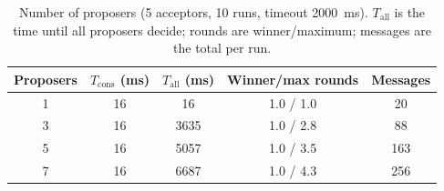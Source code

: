 \begin{table}[htbp]
\centering
\small
\begin{tabular}{c|c|c|c|c}
\hline
Proposers & $T_{\mathrm{cons}}$ (ms) & $T_{\mathrm{all}}$ (ms) & Winner/max rounds & Messages \\
\hline
1 & 16 & 16 & 1.0 / 1.0 & 20 \\
3 & 16 & 3635 & 1.0 / 2.8 & 88 \\
5 & 16 & 5057 & 1.0 / 3.5 & 163 \\
7 & 16 & 6687 & 1.0 / 4.3 & 256 \\
\hline
\end{tabular}
\caption{Number of proposers (5 acceptors, 10 runs, timeout 2000~ms). $T_{\mathrm{all}}$ is the time until all proposers decide; rounds are winner/maximum; messages are the total per run.}
\label{tab:proposers}
\end{table}
